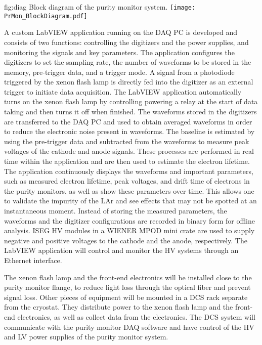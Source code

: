 \begin{dunefigure}{fig:diag}
  {Block diagram of the purity monitor system.}
  \texttt{[image: PrMon\_BlockDiagram.pdf]}%
\end{dunefigure}

A custom LabVIEW application running on the DAQ PC is developed and consists of two functions: controlling the digitizers and the power supplies, and monitoring the signals and key parameters. The application configures the digitizers to set the sampling rate, the number of waveforms to be stored in the memory, pre-trigger data, and a trigger mode. A signal from a photodiode triggered by the xenon flash lamp is directly fed into the digitizer as an external trigger to initiate data acquisition. The LabVIEW application automatically turns on the xenon flash lamp by controlling powering a relay at the start of data taking and then turns it off when finished. The waveforms stored in the digitizers are transferred to the DAQ PC and used to obtain averaged waveforms in order to reduce the electronic noise present in waveforms. The baseline is estimated by using the pre-trigger data and subtracted from the waveforms to measure peak voltages of the cathode and anode signals. These processes are performed in real time within the application and are then used to estimate the electron lifetime. The application continuously displays the waveforms and important parameters, such as measured electron lifetime, peak voltages, and drift time of electrons in the purity monitors, as well as show these parameters over time. This allows one to validate the impurity of the LAr and see effects that may not be spotted at an instantaneous moment. Instead of storing the measured parameters, the waveforms and the digitizer configurations are recorded in binary form for offline analysis. ISEG HV modules in a WIENER MPOD mini crate are used to supply negative and positive voltages to the cathode and the anode, respectively. The LabVIEW application will control and monitor the HV systems through an Ethernet interface.  

The xenon flash lamp and the front-end electronics will be installed close to the purity monitor flange, to reduce light loss through the optical fiber and prevent signal loss. Other pieces of equipment will be mounted in a DCS rack separate from the cryostat. They distribute power to the xenon flash lamp and the front-end electronics, as well as collect data from the electronics. The DCS system will communicate with the purity monitor DAQ software and have control of the HV and LV power supplies of the purity monitor system. 

